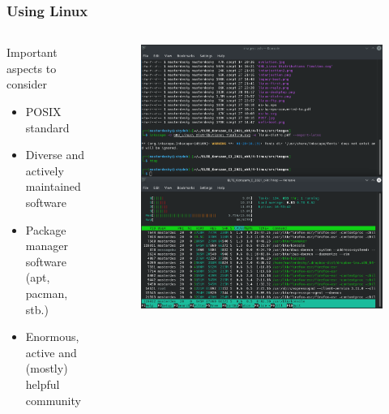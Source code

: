 \begin{frame}
\frametitle{Using Linux}

\begin{columns}
	\begin{block}{Important aspects to consider}
		\begin{itemize}
			\item POSIX standard
			\item Diverse and actively maintained software
			\item Package manager software (apt, pacman, stb.)
			\item Enormous, active and (mostly) helpful community
		\end{itemize}
	\end{block}
	

	\begin{figure}
		\includegraphics[width=1.0\textwidth]{img/linux-deskptop.png}
	\end{figure}

\end{columns}
\end{frame}

